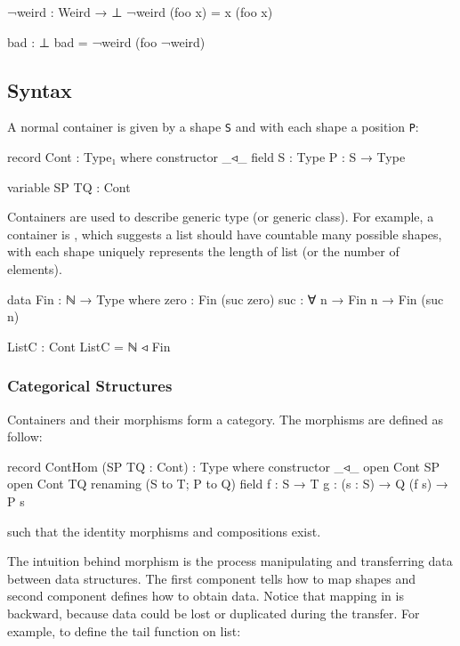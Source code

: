 \begin{code}
¬weird : Weird → ⊥
¬weird (foo x) = x (foo x)

bad : ⊥
bad = ¬weird (foo ¬weird)
\end{code}

\subsection{Syntax}

A normal container is given by a shape \texttt{S} and with each shape a position \texttt{P}:

\begin{code}
record Cont : Type₁ where
  constructor _◃_
  field
    S : Type
    P : S → Type
\end{code}

\begin{code}[hide]
variable SP TQ : Cont
\end{code}

Containers are used to describe generic type (or generic class). For example, a  container is   , which suggests a list should have countable many possible shapes, with each shape uniquely represents the length of list (or the number of elements).

\begin{code}
data Fin : ℕ → Type where
  zero : Fin (suc zero)
  suc  : ∀ {n} → Fin n → Fin (suc n)

ListC : Cont
ListC = ℕ ◃ Fin
\end{code}

\subsubsection*{Categorical Structures}

Containers and their morphisms form a category. The morphisms are defined as follow:

\begin{code}
record ContHom (SP TQ : Cont) : Type where
  constructor _◃_
  open Cont SP
  open Cont TQ renaming (S to T; P to Q)
  field
    f : S → T
    g : (s : S) → Q (f s) → P s
\end{code}

such that the identity morphisms and compositions exist.

The intuition behind morphism is the process manipulating and transferring data between data structures. The first component  tells how to map shapes and second component  defines how to obtain data. Notice that mapping in  is backward, because data could be lost or duplicated during the transfer. For example, to define the tail function on list:

